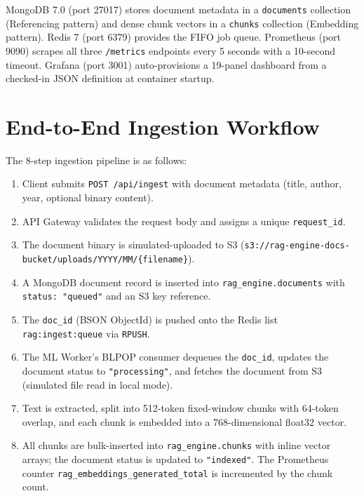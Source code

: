 \documentclass[12pt,a4paper]{report}
\begin{document}
\begin{description}[leftmargin=2.5cm, style=nextline]
  \item[\textbf{Tier 4: Storage and Observability Layer}]
        MongoDB 7.0 (port 27017) stores document metadata in a
        \texttt{documents} collection (Referencing pattern) and dense chunk
        vectors in a \texttt{chunks} collection (Embedding pattern). Redis
        7 (port 6379) provides the FIFO job queue. Prometheus (port 9090)
        scrapes all three \texttt{/metrics} endpoints every 5 seconds with a
        10-second timeout. Grafana (port 3001) auto-provisions a 19-panel
        dashboard from a checked-in JSON definition at container startup.
\end{description}

\section{End-to-End Ingestion Workflow}

The 8-step ingestion pipeline is as follows:

\begin{enumerate}[leftmargin=2cm]
  \item Client submits \texttt{POST /api/ingest} with document metadata (title,
        author, year, optional binary content).
  \item API Gateway validates the request body and assigns a unique
        \texttt{request\_id}.
  \item The document binary is simulated-uploaded to S3
        (\texttt{s3://rag-engine-docs-bucket/uploads/YYYY/MM/\{filename\}}).
  \item A MongoDB document record is inserted into \texttt{rag\_engine.documents}
        with \texttt{status: "queued"} and an S3 key reference.
  \item The \texttt{doc\_id} (BSON ObjectId) is pushed onto the Redis list
        \texttt{rag:ingest:queue} via \texttt{RPUSH}.
  \item The ML Worker's BLPOP consumer dequeues the \texttt{doc\_id}, updates
        the document status to \texttt{"processing"}, and fetches the document
        from S3 (simulated file read in local mode).
  \item Text is extracted, split into 512-token fixed-window chunks with 64-token
        overlap, and each chunk is embedded into a 768-dimensional float32 vector.
  \item All chunks are bulk-inserted into \texttt{rag\_engine.chunks} with
        inline vector arrays; the document status is updated to
        \texttt{"indexed"}. The Prometheus counter
        \texttt{rag\_embeddings\_generated\_total} is incremented by the chunk
        count.
\end{enumerate}
\end{document}
